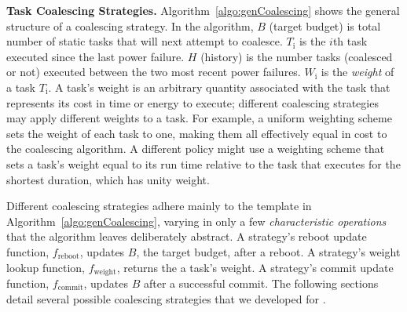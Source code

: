 \begin{figure}
\end{figure}
%
%
\noindent \textbf{Task Coalescing Strategies.} Algorithm~\ref{algo:genCoalescing} shows the general structure of a coalescing strategy. In the algorithm, $B$ (target budget) is total number of static tasks
that \sys will next attempt to coalesce. $T_\text{i}$ is the $i$th task
executed since the last power failure. $H$ (history) is the number tasks
(coalesced or not) executed between the two most recent power failures.
$W_\text{i}$ is the {\em weight} of a task $T_\text{i}$.  A task's weight is an
arbitrary quantity associated with the task that represents its cost in time or
energy to execute; different coalescing strategies may apply different weights
to a task.  For example, a uniform weighting scheme sets the weight of each
task to one, making them all effectively equal in cost to the coalescing
algorithm.  A different policy might use a weighting scheme that sets a task's
weight equal to its run time relative to the task that executes for the
shortest duration, which has unity weight. 

Different coalescing strategies adhere mainly to the template in
Algorithm~\ref{algo:genCoalescing}, varying in only a few {\em characteristic
operations} that the algorithm leaves deliberately abstract.  A strategy's
reboot update function, $f_\text{reboot}$, updates $B$, the target budget,
after a reboot. A strategy's weight lookup function, $f_\text{weight}$, returns
the a task's weight.  A strategy's commit update function, $f_\text{commit}$,
updates $B$ after a successful commit. The following sections detail several
possible coalescing strategies that we developed for \sys. 

